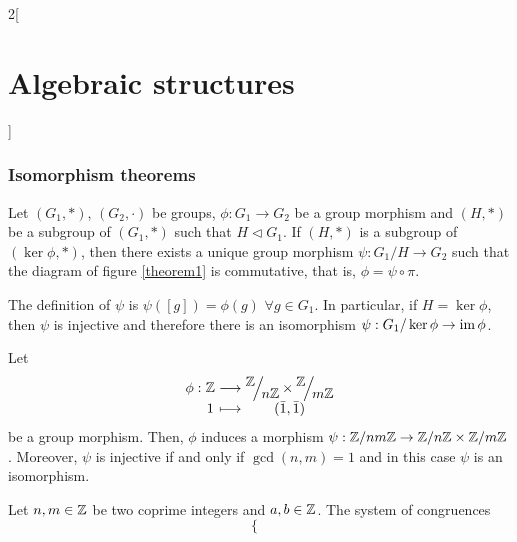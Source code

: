 \documentclass[../../../main.tex]{subfiles}
\begin{document}
\begin{multicols}{2}[\section{Algebraic structures}]
    \subsubsection*{Isomorphism theorems}
    \begin{theorem}
        Let $(G_1,*)$, $(G_2,\cdot)$ be groups, $\phi:G_1\rightarrow G_2$ be a group morphism and $(H,*)$ be a subgroup of $(G_1,*)$ such that $H\lhd G_1$. If $(H,*)$ is a subgroup of $(\ker\phi,*)$, then there exists a unique group morphism $\psi:G_1/H\rightarrow G_2$ such that the diagram of figure \ref{theorem1} is commutative, that is, $\phi=\psi\circ\pi$.
        \begin{center}
            \begin{minipage}{\linewidth}
                \centering
                
                \label{theorem1}
            \end{minipage}
        \end{center}
        The definition of $\psi$ is $\psi([g])=\phi(g)$ $\forall g\in G_1$.
        In particular, if $H=\ker\phi$, then $\psi$ is injective and therefore there is an isomorphism $\psi:G_1/\ker\phi\rightarrow\im\phi$.
    \end{theorem}
    \begin{theorem}
        Let
        \begin{equation*}
            \begin{array}{r@{\hspace{0.5\tabcolsep}}c@{\hspace{0.5\tabcolsep}}c@{\hspace{0.5\tabcolsep}}c}
                \phi: & \ZZ & \longrightarrow & \displaystyle\quot{\ZZ }{n\ZZ }\times\quot{\ZZ }{m\ZZ } \\
                      & 1   & \longmapsto     & (\Bar{1},\Bar{1})
            \end{array}
        \end{equation*}
        be a group morphism. Then, $\phi$ induces a morphism $\psi:\ZZ /nm\ZZ \rightarrow\ZZ /n\ZZ \times\ZZ /m\ZZ $. Moreover, $\psi$ is injective if and only if $\gcd(n,m)=1$ and in this case $\psi$ is an isomorphism.
    \end{theorem}
    \begin{corollary}
        Let $n,m\in\ZZ $ be two coprime integers and $a,b\in\ZZ $. The system of congruences $$\left\{\begin{array}{l}

\end{array}$$
\end{corollary}
\end{multicols}
\end{document}
